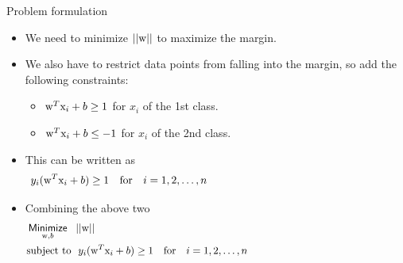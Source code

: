 \begin{frame}{Problem formulation}
\begin{itemize}
\item We need to minimize $||{\rm w}||$ to maximize the margin.
\item We also have to restrict data points from falling into the margin, so add the following constraints:
\begin{itemize}
\item ${\rm w}^T{\rm x}_i+b\geq 1$ for ${x}_i$ of the 1st class.
\item ${\rm w}^T{\rm x}_i+b\leq -1$ for ${x}_i$ of the 2nd class.
\end{itemize}
\item This can be written as
\[y_i({\rm w}^T{\rm x}_i+b)\geq 1~~~\text{for}~~~i=1,2,\ldots,n\hspace{7cm}\]
\item Combining the above two
\begin{align*}
&\mathop{\sf Minimize}\limits_{{\rm w},b}~~||{\rm w}||\hspace{6cm}\\
&\text{subject to}~~y_i( {{{\rm w}^T}{{\rm x}_i} + b} ) \geq 1~~~\text{for}~~~i=1,2,\ldots,n\hspace{6cm}
\end{align*}
\end{itemize}
\end{frame}

